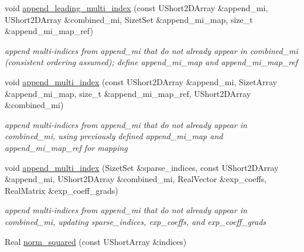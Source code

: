 \begin{DoxyCompactItemize}
void \hyperlink{classPecos_1_1SharedOrthogPolyApproxData_a964cfc01b4cb371008236c42e240a7f8}{append\+\_\+leading\+\_\+multi\+\_\+index} (const U\+Short2\+D\+Array \&append\+\_\+mi, U\+Short2\+D\+Array \&combined\+\_\+mi, Sizet\+Set \&append\+\_\+mi\+\_\+map, size\+\_\+t \&append\+\_\+mi\+\_\+map\+\_\+ref)
\begin{DoxyCompactList}\small\item\em append multi-\/indices from append\+\_\+mi that do not already appear in combined\+\_\+mi (consistent ordering assumed); define append\+\_\+mi\+\_\+map and append\+\_\+mi\+\_\+map\+\_\+ref \end{DoxyCompactList}\item 
void \hyperlink{classPecos_1_1SharedOrthogPolyApproxData_add60899f51ee8d6d7d67c3bd5a55822b}{append\+\_\+multi\+\_\+index} (const U\+Short2\+D\+Array \&append\+\_\+mi, Sizet\+Array \&append\+\_\+mi\+\_\+map, size\+\_\+t \&append\+\_\+mi\+\_\+map\+\_\+ref, U\+Short2\+D\+Array \&combined\+\_\+mi)
\begin{DoxyCompactList}\small\item\em append multi-\/indices from append\+\_\+mi that do not already appear in combined\+\_\+mi, using previously defined append\+\_\+mi\+\_\+map and append\+\_\+mi\+\_\+map\+\_\+ref for mapping \end{DoxyCompactList}\item 
void \hyperlink{classPecos_1_1SharedOrthogPolyApproxData_ae8082d000d8fa616ff217762875d21f6}{append\+\_\+multi\+\_\+index} (Sizet\+Set \&sparse\+\_\+indices, const U\+Short2\+D\+Array \&append\+\_\+mi, U\+Short2\+D\+Array \&combined\+\_\+mi, Real\+Vector \&exp\+\_\+coeffs, Real\+Matrix \&exp\+\_\+coeff\+\_\+grads)
\begin{DoxyCompactList}\small\item\em append multi-\/indices from append\+\_\+mi that do not already appear in combined\+\_\+mi, updating sparse\+\_\+indices, exp\+\_\+coeffs, and exp\+\_\+coeff\+\_\+grads \end{DoxyCompactList}\item 
Real \hyperlink{classPecos_1_1SharedOrthogPolyApproxData_ae73f764fee87689e8be7b7095e51c298}{norm\+\_\+squared} (const U\+Short\+Array \&indices)\label{classPecos_1_1SharedOrthogPolyApproxData_ae73f764fee87689e8be7b7095e51c298}


\end{DoxyCompactItemize}
